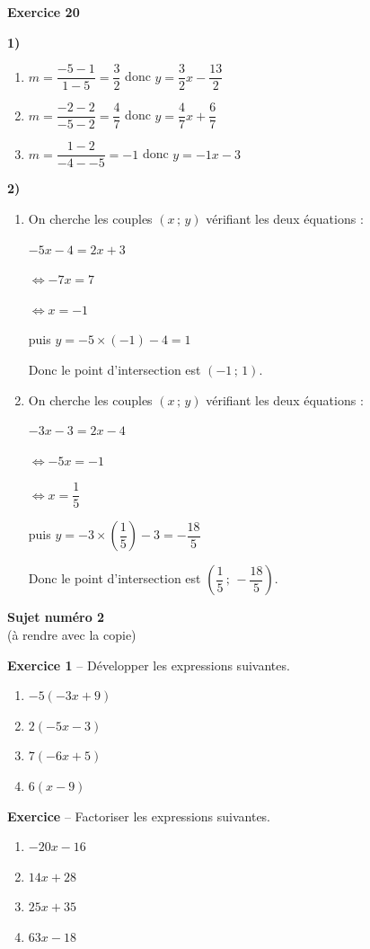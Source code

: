 \documentclass[12pt,a4paper,french]{article}
\begin{document}
\noindent\textbf{Exercice 20}\par
\smallskip
\textbf{1)}
\begin{enumerate}
\item $m = \dfrac{-5-1}{1-5} = \dfrac{3}{2}$ donc $y = \dfrac{3}{2}x - \dfrac{13}{2}$
\item $m = \dfrac{-2-2}{-5-2} = \dfrac{4}{7}$ donc $y = \dfrac{4}{7}x + \dfrac{6}{7}$
\item $m = \dfrac{1-2}{-4--5} = -1$ donc $y = -1x - 3$
\end{enumerate}
\textbf{2)}
\begin{enumerate}
\item On cherche les couples $(x\,;\,y)$ vérifiant les deux équations :

$-5x - 4 = 2x + 3$

$\Leftrightarrow -7x = 7$

$\Leftrightarrow x = -1$

puis $y = -5 \times (-1) - 4 = 1$

Donc le point d'intersection est $\left(-1\,;\,1\right)$.
\item On cherche les couples $(x\,;\,y)$ vérifiant les deux équations :

$-3x - 3 = 2x - 4$

$\Leftrightarrow -5x = -1$

$\Leftrightarrow x = \dfrac{1}{5}$

puis $y = -3 \times (\dfrac{1}{5}) - 3 = - \dfrac{18}{5}$

Donc le point d'intersection est $\left(\dfrac{1}{5}\,;\,- \dfrac{18}{5}\right)$.
\end{enumerate}
\medskip

\newpage
\begin{center}
\textbf{Sujet numéro 2}
\\(à rendre avec la copie)
\end{center}


\noindent\textbf{Exercice 1} -- Développer les expressions suivantes.
\begin{enumerate}
\item $-5(-3x + 9)$
\item $2(-5x - 3)$
\item $7(-6x + 5)$
\item $6(x - 9)$
\end{enumerate}
\noindent\textbf{Exercice} -- Factoriser les expressions suivantes.
\begin{enumerate}
\item $-20x - 16$
\item $14x + 28$
\item $25x + 35$
\item $63x - 18$
\end{enumerate}
\bigskip
\end{document}
